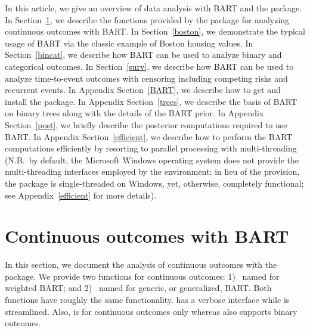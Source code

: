 \documentclass[article]{jss}
\begin{document}
In this article, we give an overview of data analysis with BART and
the   package.  In Section~\ref{cont}, we
describe the  functions provided by the  package
for analyzing continuous outcomes with BART.  In Section~\ref{boston},
we demonstrate the typical usage of BART via the classic example of
Boston housing values.  In Section~\ref{bincat}, we describe how BART
can be used to analyze binary and categorical outcomes.  In
Section~\ref{surv}, we describe how BART can be used to analyze
time-to-event outcomes with censoring including competing risks and
recurrent events.  In Appendix Section~\ref{BART}, we describe how to
get and install the  package.  In Appendix
Section~\ref{trees}, we describe the basis of BART on binary trees
along with the details of the BART prior.  In Appendix
Section~\ref{post}, we briefly describe the posterior computations
required to use BART.  In Appendix Section~\ref{efficient}, we
describe how to perform the BART computations efficiently by resorting
to parallel processing with multi-threading 
(N.B.\ by default, the Microsoft Windows operating system does not
provide the multi-threading interfaces employed by the 
environment; in lieu of the provision, the  package is
single-threaded on Windows, yet, otherwise, completely functional; see
Appendix~\ref{efficient} for more details).

\section{Continuous outcomes with BART}\label{cont}

In this section, we document the analysis of continuous outcomes with
the   package.  We provide two functions for
continuous outcomes: 1)~ named for weighted BART; and
2)~ named for generic, or generalized, BART.  Both functions
have roughly the same functionality.   has a verbose
interface while  is streamlined.  Also, 
is for continuous outcomes only whereas  also supports 
binary outcomes.
\end{document}

